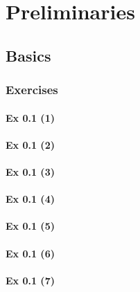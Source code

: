 \setcounter{chapter}{0}
\renewcommand{\thechapter}{0}
\chapter{Preliminaries}\label{ch:0}
\setcounter{equation}{0}	        %

\section{Basics}\label{sec:0.1}	
\subsection*{Exercises}\label{sec:0.1_Exercises}

\subsubsection{Ex 0.1 (1)}\label{sec:Ex_0.1.1}

\subsubsection{Ex 0.1 (2)}\label{sec:Ex_0.1.2}

\subsubsection{Ex 0.1 (3)}\label{sec:Ex_0.1.3}

\subsubsection{Ex 0.1 (4)}\label{sec:Ex_0.1.4}

\subsubsection{Ex 0.1 (5)}\label{sec:Ex_0.1.5}

\subsubsection{Ex 0.1 (6)}\label{sec:Ex_0.1.6}

\subsubsection{Ex 0.1 (7)}\label{sec:Ex_0.1.7}

